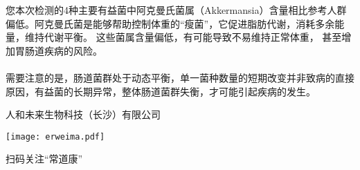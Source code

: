 \vspace*{-2.5mm}

\vspace*{3mm}
\begin{spacing}{1.5}

\vspace*{2mm}
{\indent\fontsize{9pt}{10pt}\selectfont 
您本次检测的4种主要有益菌中阿克曼氏菌属（Akkermansia）含量相比参考人群偏低。阿克曼氏菌是能够帮助控制体重的“瘦菌”，它促进脂肪代谢，消耗多余能量，维持代谢平衡。
这些菌属含量偏低，有可能导致不易维持正常体重，
甚至增加胃肠道疾病的风险。
\\\\
\indent 需要注意的是，肠道菌群处于动态平衡，单一菌种数量的短期改变并非致病的直接原因，有益菌的长期异常，整体肠道菌群失衡，才可能引起疾病的发生。}
\end{spacing}

\vspace*{5mm}

\noindent\colorbox{topcolor}{
\parbox{0.6\hsize}{
\color{white}\fontsize{9pt}{\baselineskip}\selectfont { 以上为您本次检测结果，如有任何疑问，请咨询专业医生！}
}
}

\vspace*{.5mm}

\noindent\colorbox{topcolor}{
\parbox{0.6\hsize}{
\color{white}\fontsize{9pt}{\baselineskip}\selectfont { 再次感谢您的信任和支持！}
}
}

\vspace*{3mm}

\hfill\fontsize{9pt}{11pt}\selectfont 人和未来生物科技（长沙）有限公司

\vspace*{-2mm}

\hfill\texttt{[image: erweima.pdf]}


\hfill\fontsize{9pt}{11pt}\selectfont 扫码关注“常道康”



